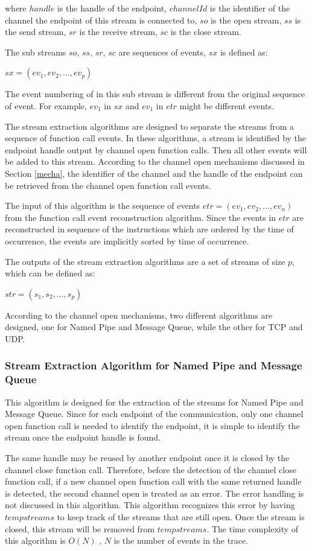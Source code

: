 where $handle$ is the handle of the endpoint, $channelId$ is the identifier of the channel the endpoint of this stream is connected to, $so$ is the open stream, $ss$ is the send stream, $sr$ is the receive stream, $sc$ is the close stream. 

The sub streams $so$, $ss$, $sr$, $sc$ are sequences of events, $sx$ is defined as:

$sx = (ev_1, ev_2, ..., ev_p)$

The event numbering of in this sub stream is different from the original sequence of event. For example, $ev_1$ in $sx$ and $ev_1$ in $etr$ might be different events.

The stream extraction algorithms are designed to separate the streams from a sequence of function call events. In these algorithms, a stream is identified by the endpoint handle output by channel open function calls. Then all other events will be added to this stream.  According to the channel open mechanisms discussed in Section \ref{mecha}, the identifier of the channel and the handle of the endpoint can be retrieved from the channel open function call events.

The input of this algorithm is the sequence of events $etr = (ev_1, ev_2, ..., ev_n)$ from the function call event reconstruction algorithm. Since the events in $etr$ are reconstructed in sequence of the instructions which are ordered by the time of occurrence, the events are implicitly sorted by time of occurrence. 

The outputs of the stream extraction algorithms are a set of streams of size $p$, which can be defined as:

$str = (s_1, s_2, ..., s_p)$

According to the channel open mechanisms, two different algorithms are designed, one for Named Pipe and Message Queue, while the other for TCP and UDP. 

\subsubsection{Stream Extraction Algorithm for Named Pipe and Message Queue}
This algorithm is designed for the extraction of the streams for Named Pipe and Message Queue. Since for each endpoint of the communication, only one channel open function call is needed to identify the endpoint, it is simple to identify the stream once the endpoint handle is found. 

The same handle may be reused by another endpoint once it is closed by the channel close function call. Therefore, before the detection of the channel close function call, if a new channel open function call with the same returned handle is detected, the second channel open is treated as an error. The error handling is not discussed in this algorithm. This algorithm recognizes this error by having $tempstreams$ to keep track of the streams that are still open. Once the stream is closed, this stream will be removed from $tempstreams$. The time complexity of this algorithm is $O(N)$ , $N$ is the number of events in the trace.

